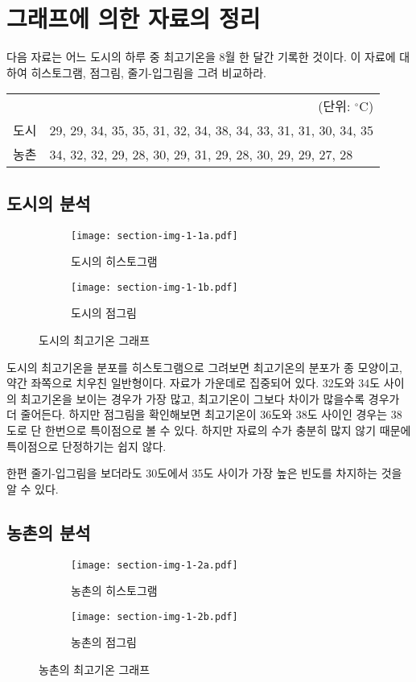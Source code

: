 \section{그래프에 의한 자료의 정리}

다음 자료는 어느 도시의 하루 중 최고기온을 8월 한 달간 기록한 것이다.
이 자료에 대하여 히스토그램, 점그림, 줄기-입그림을 그려 비교하라.

\begin{tabularx}{0.9\textwidth}{ l|X }
  \multicolumn{2}{r}{\small(단위: $^{\circ}\mathrm{C}$)} \\
  \noalign{\smallskip}\hline\noalign{\smallskip}
  도시 &
  29, 29, 34, 35, 35, 31, 32, 34, 38, 34, 33, 31, 31, 30, 34, 35 \\
  농촌 &
  34, 32, 32, 29, 28, 30, 29, 31, 29, 28, 30, 29, 29, 27, 28 \\
\end{tabularx}

\subsection{도시의 분석}
\begin{figure}[b]
  \begin{subfigure}[b]{0.5\textwidth}
    \centering
    \texttt{[image: section-img-1-1a.pdf]}
    \caption{도시의 히스토그램}
  \end{subfigure}
  \begin{subfigure}[b]{0.5\textwidth}
    \centering
    \texttt{[image: section-img-1-1b.pdf]}
    \caption{도시의 점그림}
  \end{subfigure}
  \caption{도시의 최고기온 그래프}
\end{figure}

도시의 최고기온을 분포를 히스토그램으로 그려보면
최고기온의 분포가 종 모양이고, 약간 좌쪽으로 치우친 일반형이다.
자료가 가운데로 집중되어 있다. 32도와 34도 사이의 최고기온을 보이는 경우가 가장 많고,
최고기온이 그보다 차이가 많을수록 경우가 더 줄어든다. 하지만 점그림을 확인해보면
최고기온이 36도와 38도 사이인 경우는 38도로 단 한번으로 특이점으로 볼 수 있다.
하지만 자료의 수가 충분히 많지 않기 때문에 특이점으로 단정하기는 쉽지 않다.


한편 줄기-입그림을 보더라도 30도에서 35도 사이가 가장 높은 빈도를 차지하는 것을
알 수 있다.

\subsection{농촌의 분석}
\begin{figure}[b]
  \begin{subfigure}[b]{0.5\textwidth}
    \centering
    \texttt{[image: section-img-1-2a.pdf]}
    \caption{농촌의 히스토그램}
  \end{subfigure}
  \begin{subfigure}[b]{0.5\textwidth}
    \centering
    \texttt{[image: section-img-1-2b.pdf]}
    \caption{농촌의 점그림}
  \end{subfigure}
  \caption{농촌의 최고기온 그래프}
\end{figure}

